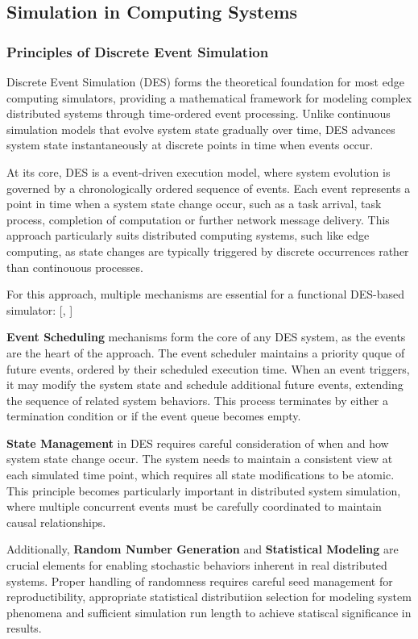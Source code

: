 \subsection{Simulation in Computing Systems}
\subsubsection{Principles of Discrete Event Simulation}
Discrete Event Simulation (DES) forms the theoretical foundation for most edge computing simulators, providing a mathematical framework for modeling complex distributed systems through time-ordered event processing.
Unlike continuous simulation models that evolve system state gradually over time, DES advances system state instantaneously at discrete points in time when events occur.

At its core, DES is a event-driven execution model, where system evolution is governed by a chronologically ordered sequence of events.
Each event represents a point in time when a system state change occur, such as a task arrival, task process, completion of computation or further network message delivery.
This approach particularly suits distributed computing systems, such like edge computing, as state changes are typically triggered by discrete occurrences rather than continouous processes.

For this approach, multiple mechanisms are essential for a functional DES-based simulator: [\cite{DES-sota}, \cite{DES-fptp}]

\textbf{Event Scheduling} mechanisms form the core of any DES system, as the events are the heart of the approach. The event scheduler maintains a priority quque of future events, ordered by their scheduled execution time.
When an event triggers, it may modify the system state and schedule additional future events, extending the sequence of related system behaviors.
This process terminates by either a termination condition or if the event queue becomes empty.

\textbf{State Management} in DES requires careful consideration of when and how system state change occur.
The system needs to maintain a consistent view at each simulated time point, which requires all state modifications to be atomic.
This principle becomes particularly important in distributed system simulation, where multiple concurrent events must be carefully coordinated to maintain causal relationships.

Additionally, \textbf{Random Number Generation} and \textbf{Statistical Modeling} are crucial elements for enabling stochastic behaviors inherent in real distributed systems.
Proper handling of randomness requires careful seed management for reproductibility, appropriate statistical distributiion selection for modeling system phenomena and sufficient simulation run length to achieve statiscal significance in results.

